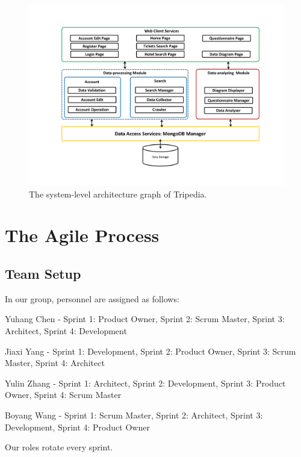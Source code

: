 \documentclass[conference]{IEEEtran}
\begin{document}
\begin{figure}[htbp]
\centerline{\includegraphics[width=1.0\textwidth]{Architecture2.pdf}}
\caption{The system-level architecture graph of Tripedia.}
\label{system_level_arch}
\end{figure}




\section{\textbf{The Agile Process}}


\subsection{\textbf{Team Setup}}

In our group, personnel are assigned as follows:

Yuhang Chen - Sprint 1: Product Owner, Sprint 2: Scrum Master, Sprint 3: Architect, Sprint 4: Development

Jiaxi Yang - Sprint 1: Development, Sprint 2: Product Owner, Sprint 3: Scrum Master, Sprint 4: Architect

Yulin Zhang - Sprint 1: Architect, Sprint 2: Development, Sprint 3: Product Owner, Sprint 4: Scrum Master

Boyang Wang - Sprint 1: Scrum Master, Sprint 2: Architect, Sprint 3: Development, Sprint 4: Product Owner

Our roles rotate every sprint.
\end{document}
